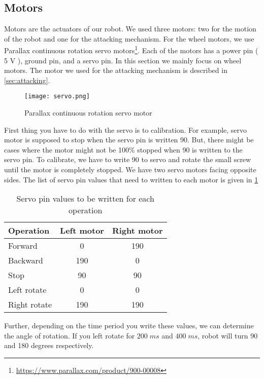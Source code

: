 \documentclass[11pt, letterpaper, oneside]{article}
\begin{document}
\subsection{Motors}
Motors are the actuators of our robot. We used three motors: two for the motion of the robot and one for the attacking mechanism. For the wheel motors, we use Parallax continuous rotation servo motors\footnote{\url{https://www.parallax.com/product/900-00008}}. Each of the motors has a power pin ( 5 V ), ground pin, and a servo pin. In this section we mainly focus on wheel motors. The motor we used for the attacking mechanism is described in \cref{sec:attacking}.

\begin{figure}[bth]
	\begin{center}
		\texttt{[image: servo.png]}
		\caption{ Parallax continuous rotation servo motor}
		\label{fig:servo}
	\end{center}
\end{figure}

First thing you have to do with the servo is to calibration. For example, servo motor is supposed to stop when the servo pin is written 90. But, there might be cases where the motor might not be 100\% stopped when 90 is written to the servo pin. To calibrate, we have to write 90 to servo and rotate the small screw until the motor is completely stopped. We have two servo motors facing opposite sides. The list of servo pin values that need to written to each motor is given in \cref{tab:servo}

\begin{table}[tbh]
	\caption{Servo pin values to be written for each operation}
	\label{tab:servo}
	\begin{center}
		\begin{tabular}{|l|c|c|}
			\hline
			Operation 	& 	Left motor	&	Right motor \\ 	\hline 
			Forward 	& 	0 			&	190 		\\
			Backward 	& 	190			&	0 			\\ 
			Stop		&	90 			&	90 			\\
			Left rotate	&	0			&	0			\\
			Right rotate&	190			&	190			\\	\hline 
		\end{tabular}
	\end{center}
\end{table} 

Further, depending on the time period you write these values, we can determine the angle of rotation. If you left rotate for $200\;ms$ and $400 \;ms$, robot will turn 90 and 180 degrees respectively.\\
\end{document}
